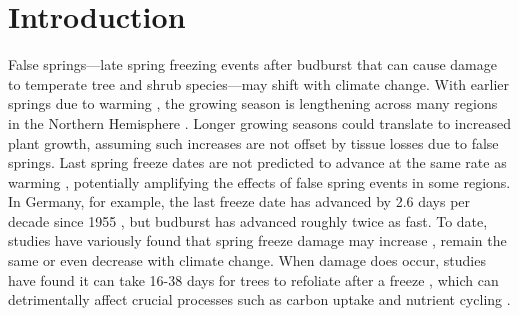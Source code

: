 \documentclass{article}\usepackage[]{graphicx}\usepackage[]{color}
\begin{document}
\section*{Introduction} %
False springs---late spring freezing events after budburst that can cause damage to temperate tree and shrub species---may shift with climate change. With earlier springs due to warming \citep{Wolkovich2012,IPCC2014}, the growing season is lengthening across many regions in the Northern Hemisphere \citep{Chen2005,Liu2006, Kukal2018}. Longer growing seasons could translate to increased plant growth, assuming such increases are not offset by tissue losses due to false springs. Last spring freeze dates are not predicted to advance at the same rate as warming \citep{Inouye2008,Martin2010,Labe2016,Wypych2016a,Sgubin2018}, potentially amplifying the effects of false spring events in some regions. In Germany, for example, the last freeze date has advanced by 2.6 days per decade since 1955 \citep{Zohner2016}, but budburst has advanced roughly twice as fast. To date, studies have variously found that spring freeze damage may increase \citep{Hannenin1991,Augspurger2013,Labe2016}, remain the same \citep{Scheifinger2003} or even decrease \citep{Kramer1994, Vitra2017} with climate change. When damage does occur, studies have found it can take 16-38 days for trees to refoliate after a freeze \citep{Gu2008,Augspurger2009, Augspurger2013, Menzel2015}, which can detrimentally affect crucial processes such as carbon uptake and nutrient cycling \citep{Hufkens2012,Richardson2013,Klosterman2018}.  
\end{document}

